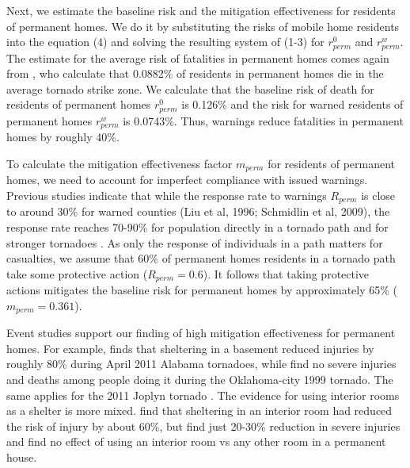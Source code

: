 \documentclass{ametsocV6.1}
\begin{document}
Next, we estimate the baseline risk and the mitigation effectiveness for residents of permanent homes. We do it by substituting the risks of mobile home residents into the equation (4) and solving the resulting system of (1-3) for $r_{perm}^0$ and $r_{perm}^w$. The estimate for the average risk of fatalities in permanent homes comes again from \citet{simmons_economic_2013}, who calculate that 0.0882\% of residents in permanent homes die in the average tornado strike zone. We calculate that the baseline risk of death for residents of permanent homes $r_{perm}^0$ is 0.126\% and the risk for warned residents of permanent homes $r_{perm}^w$ is 0.0743\%. Thus, warnings reduce fatalities in permanent homes by roughly 40\%. 

To calculate the mitigation effectiveness factor $m_{perm}$ for residents of permanent homes, we need to account for imperfect compliance with issued warnings. Previous studies indicate that while the response rate to warnings $R_{perm}$ is close to around 30\% for warned counties (Liu et al, 1996; Schmidlin et al, 2009), the response rate reaches 70-90\% for population directly in a tornado path and for stronger tornadoes \citep*{klockow_investigation_2011, paul_predictors_2015}. As only the response of individuals in a path matters for casualties, we assume that 60\% of permanent homes residents in a tornado path take some protective action ($R_{perm}=0.6$). It follows that taking protective actions mitigates the baseline risk for permanent homes by approximately 65\% ($m_{perm}=0.361$). 

Event studies support our finding of high mitigation effectiveness for permanent homes. For example, \citet{niederkrotenthaler_injuries_2013} finds that sheltering in a basement reduced injuries by roughly 80\% during April 2011 Alabama tornadoes, while \citet{daley_risk_2005} find no severe injuries and deaths among people doing it during the Oklahoma-city 1999 tornado. The same applies for the 2011 Joplyn tornado \citep*{paul_predictors_2015}. The evidence for using interior rooms as a shelter is more mixed. \citet{niederkrotenthaler_injuries_2013} find that sheltering in an interior room had reduced the risk of injury by about 60\%, but \citet{daley_risk_2005} find just 20-30\% reduction in severe injuries and \citet{hammer_response_2002} find no effect of using an interior room vs any other room in a permanent house.
\end{document}
